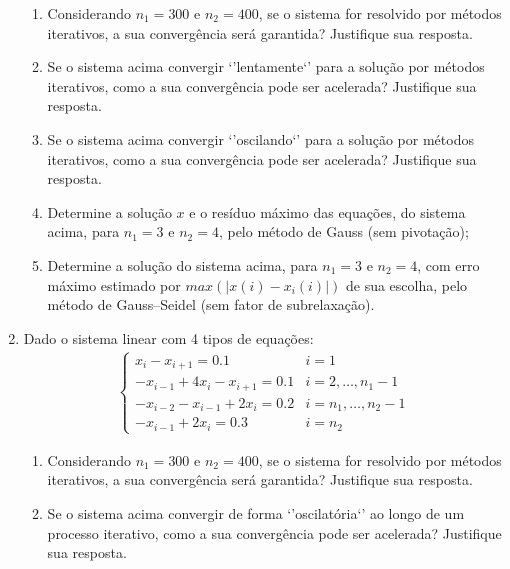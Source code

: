 \documentclass[12pt]{article}
\newenvironment{smallitem}{
    \vspace{-2mm}
    \begin{enumerate}
    \setlength{\parskip}{0pt}
    \setlength{\itemsep}{2pt}
}{
    \vspace{-2mm}
    \end{enumerate}
}
\begin{document}
\begin{enumerate}[label=\textbf{\arabic*})]
\begin{smallitem}

\item Considerando $n_1 = 300$ e $n_2 = 400$, se o sistema for resolvido por
métodos iterativos, a sua convergência será garantida? Justifique sua resposta.

\item Se o sistema acima convergir `'lentamente`' para a solução por métodos
iterativos, como a sua convergência pode ser acelerada? Justifique sua resposta.

\item Se o sistema acima convergir `'oscilando`' para a solução por métodos
iterativos, como a sua convergência pode ser acelerada? Justifique sua resposta.

\item Determine a solução $x$ e o resíduo máximo das equações, do sistema acima,
para $n_1 = 3$ e $n_2 = 4$, pelo método de Gauss (sem pivotação);

\item Determine a solução do sistema acima, para $n_1 = 3$ e $n_2 = 4$, com erro
máximo estimado por $max(\vert x(i)- x_i(i) \vert)$ de sua escolha, pelo método
de Gauss--Seidel (sem fator de subrelaxação).

\end{smallitem}

\item Dado o sistema linear com 4 tipos de equações:
\begin{align*}
\begin{cases}
x_i - x_{i + 1} = 0.1 &
i = 1 \\
- x_{i - 1} + 4x_i - x_{i + 1} = 0.1 &
i = 2, \dots, n_1 - 1 \\
- x_{i - 2} - x_{i - 1} + 2x_i = 0.2 &
i = n_1, \dots, n_2 - 1 \\
- x_{i - 1} + 2x_i = 0.3 &
i = n_2
\end{cases}
\end{align*}

\begin{smallitem}

\item Considerando $n_1 = 300$ e $n_2 = 400$, se o sistema for resolvido por
métodos iterativos, a sua convergência será garantida? Justifique sua resposta.

\item Se o sistema acima convergir de forma `'oscilatória`' ao longo de um
processo iterativo, como a sua convergência pode ser acelerada? Justifique sua
resposta.


\end{smallitem}
\end{enumerate}
\end{document}

